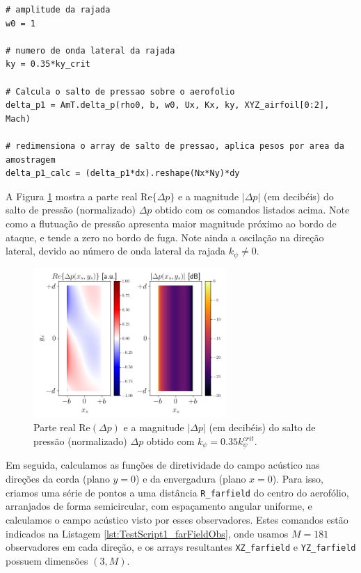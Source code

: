 \documentclass[a4paper, 11pt, twoside]{article}
\begin{document}
\begin{lstlisting}[caption={Script de teste 1 - calculando o salto de pressão},label={lst:TestScript1_deltaP}]
# amplitude da rajada
w0 = 1

# numero de onda lateral da rajada
ky = 0.35*ky_crit

# Calcula o salto de pressao sobre o aerofolio
delta_p1 = AmT.delta_p(rho0, b, w0, Ux, Kx, ky, XYZ_airfoil[0:2], Mach)

# redimensiona o array de salto de pressao, aplica pesos por area da amostragem
delta_p1_calc = (delta_p1*dx).reshape(Nx*Ny)*dy
\end{lstlisting}

A Figura \ref{fig:DeltaP_Kphi_035} mostra a parte real $\textrm{Re}\{\Delta p \}$ e a magnitude $|\Delta p|$ (em decibéis) do salto de pressão (normalizado) $\Delta p$ obtido com os comandos listados acima. Note como a flutuação de pressão apresenta maior magnitude próximo ao bordo de ataque, e tende a zero no bordo de fuga. Note ainda a oscilação na direção lateral, devido ao número de onda lateral da rajada $k_\psi \neq 0$.

\begin{figure}[htbp]
	\centering
	\includegraphics[width=0.65\textwidth]{../figures/DeltaP_Kphi_035.png}
	\caption{Parte real $\textrm{Re}(\Delta p)$ e a magnitude $|\Delta p|$ (em decibéis) do salto de pressão (normalizado) $\Delta p$ obtido com $k_\psi=0.35k_\psi^{crit}$.}
	\label{fig:DeltaP_Kphi_035}
\end{figure}

Em seguida, calculamos as funções de diretividade do campo acústico nas direções da corda (plano $y=0$) e da envergadura (plano $x=0$). Para isso, criamos uma série de pontos a uma distância \verb|R_farfield| do centro do aerofólio, arranjados de forma semicircular, com espaçamento angular uniforme, e calculamos o campo acústico visto por esses observadores. Estes comandos estão indicados na Listagem \ref{lst:TestScript1_farFieldObs}, onde usamos $M=181$ observadores em cada direção, e os arrays resultantes \verb|XZ_farfield| e \verb|YZ_farfield| possuem dimensões $(3, M)$.
\end{document}
